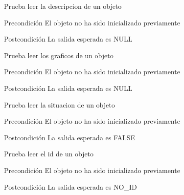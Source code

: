\begin{DoxyRefList}
\item[\label{test__test000190}%
\hypertarget{test__test000190}{}%
Global \hyperlink{object__test_8c_a6145728b36115c1b215089baa0ea2f0b}{test2\-\_\-object\-\_\-\-Get\-\_\-\-Description2} ()]Prueba leer la descripcion de un objeto \begin{DoxyPrecond}{Precondición}
El objeto no ha sido inicializado previamente 
\end{DoxyPrecond}
\begin{DoxyPostcond}{Postcondición}
La salida esperada es N\-U\-L\-L  
\end{DoxyPostcond}

\item[\label{test__test000184}%
\hypertarget{test__test000184}{}%
Global \hyperlink{object__test_8c_a31533ac9316702e946fcf9736636762b}{test2\-\_\-object\-\_\-\-Get\-\_\-\-Graphics} ()]Prueba leer los graficos de un objeto \begin{DoxyPrecond}{Precondición}
El objeto no ha sido inicializado previamente 
\end{DoxyPrecond}
\begin{DoxyPostcond}{Postcondición}
La salida esperada es N\-U\-L\-L  
\end{DoxyPostcond}

\item[\label{test__test000196}%
\hypertarget{test__test000196}{}%
Global \hyperlink{object__test_8c_a26ae3e18dbc5071c56597dd6ecffd6e3}{test2\-\_\-object\-\_\-\-Get\-\_\-\-Hidden} ()]Prueba leer la situacion de un objeto \begin{DoxyPrecond}{Precondición}
El objeto no ha sido inicializado previamente 
\end{DoxyPrecond}
\begin{DoxyPostcond}{Postcondición}
La salida esperada es F\-A\-L\-S\-E  
\end{DoxyPostcond}

\item[\label{test__test000186}%
\hypertarget{test__test000186}{}%
Global \hyperlink{object__test_8c_ae971259646fcd6b9269ebafe009085db}{test2\-\_\-object\-\_\-\-Get\-\_\-\-Id} ()]Prueba leer el id de un objeto \begin{DoxyPrecond}{Precondición}
El objeto no ha sido inicializado previamente 
\end{DoxyPrecond}
\begin{DoxyPostcond}{Postcondición}
La salida esperada es N\-O\-\_\-\-I\-D  
\end{DoxyPostcond}


\end{DoxyRefList}
